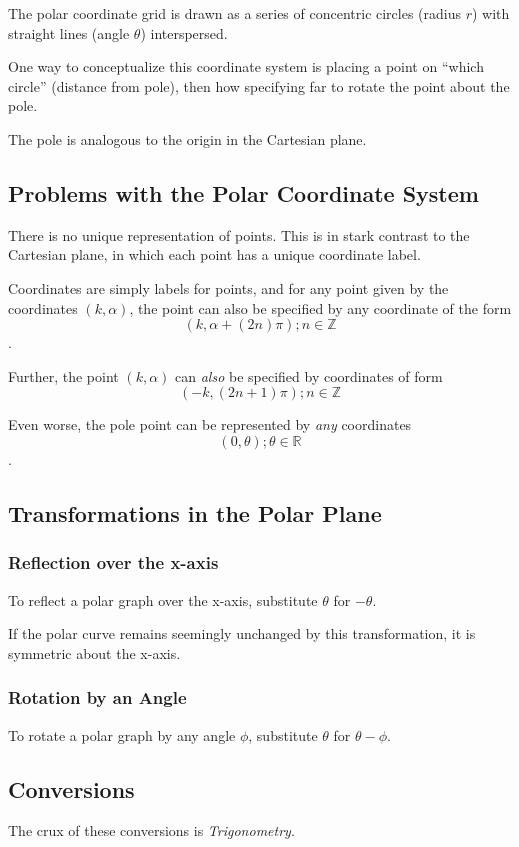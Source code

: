 \documentclass{article}
\begin{document}
The polar coordinate grid is drawn as a series of concentric circles (radius $r$) with straight lines (angle $\theta$) interspersed.

One way to conceptualize this coordinate system is placing a point on ``which circle'' (distance from pole), then how specifying far to rotate the point about the pole.

The pole is analogous to the origin in the Cartesian plane.

\subsection{Problems with the Polar Coordinate System}
There is no unique representation of points. This is in stark contrast to the Cartesian plane, in which each point has a unique coordinate label.

Coordinates are simply labels for points, and for any point given by the coordinates $(k, \alpha)$, the point can also be specified by any coordinate of the form $$(k, \alpha + (2n)\pi); n \in \mathbb{Z}$$.

Further, the point $(k, \alpha)$ can \emph{also} be specified by coordinates of form $$(-k, (2n+1)\pi); n \in \mathbb{Z}$$

Even worse, the pole point can be represented by \emph{any} coordinates $$(0, \theta); \theta \in \mathbb{R}$$.

\subsection{Transformations in the Polar Plane}
\subsubsection{Reflection over the x-axis}
To reflect a polar graph over the x-axis, substitute $\theta$ for $-\theta$.

If the polar curve remains seemingly unchanged by this transformation, it is symmetric about the x-axis.

\subsubsection{Rotation by an Angle}
To rotate a polar graph by any angle $\phi$, substitute $\theta$ for $\theta - \phi$.

\subsection{Conversions}
The crux of these conversions is \emph{Trigonometry}.
\end{document}
